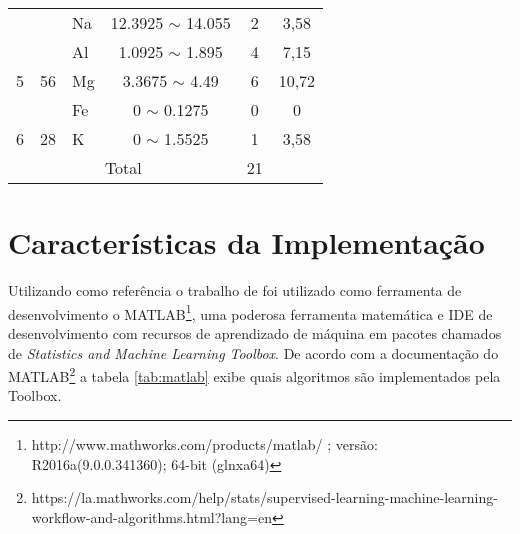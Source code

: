 \begin{apendicesenv}
\begin{table}[H]
{{\begin{tabular}{cclccc}
  &    &   Na  &   12.3925 $\sim$  14.055 & 2 &  3,58\\
  &    &  Al  &   1.0925 $\sim$  1.895 & 4 &  7,15\\
\multirow{-5}{*}{5}  &    \multirow{-5}{*}{56}   &  Mg  &   3.3675 $\sim$  4.49 & 6 &  10,72\\ \hline
   &    &  Fe  &   0 $\sim$  0.1275 & 0 &  0\\
 \multirow{-2}{*}{6}  &    \multirow{-2}{*}{28}  &  K  &   0 $\sim$  1.5525 & 1 &  3,58 \\ \hline
\multicolumn{4}{c}{Total}                             & 21   &\\ \hline
\end{tabular}
} %
} %




 \end{table}

 
 

\chapter{Características da Implementação}
\label{apendice:2}
Utilizando como referência o  trabalho de  \cite{Lopes2016} foi utilizado como ferramenta de desenvolvimento o MATLAB\footnote{http://www.mathworks.com/products/matlab/ ; versão: R2016a(9.0.0.341360); 64-bit (glnxa64)}, uma poderosa ferramenta matemática e IDE de desenvolvimento com recursos de aprendizado de máquina em pacotes chamados de \textit{Statistics and Machine Learning Toolbox}. De acordo com a documentação do MATLAB\footnote{https://la.mathworks.com/help/stats/supervised-learning-machine-learning-workflow-and-algorithms.html?lang=en} a  tabela \ref{tab:matlab} exibe quais algoritmos são implementados pela Toolbox.




\end{apendicesenv}
